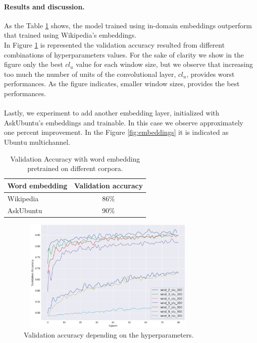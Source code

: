 \documentclass[10pt,twocolumn,letterpaper]{article}
\begin{document}
\paragraph{Results and discussion.}
As the Table \ref{table:accuracy} shows, the model trained using in-domain embeddings outperform that trained using Wikipedia's embeddings. \\
In Figure \ref{fig:wiki} is represented the validation accuracy resulted from different combinations of hyperparameters values. For the sake of clarity we show in the figure only the best $cl_{u}$ value for each window size, but we observe that increasing too much the number of units of the convolutional layer, $cl_{u}$, provides worst performances.  As the figure indicates, smaller window sizes, provides the best performances. \\~\\
Lastly, we experiment to add another embedding layer, initialized with AskUbuntu's embeddings and trainable. In this case we observe approximately one percent improvement. In the Figure \ref{fig:embeddings} it is indicated as Ubuntu multichannel.
\begin{table}
\begin{center}
\begin{tabular}{|l|c|}
\hline
Word embedding & Validation accuracy \\
\hline
Wikipedia & 86\% \\
AskUbuntu & 90\% \\
\hline
\end{tabular}
\end{center}
\caption{Validation Accuracy with word embedding pretrained on different corpora.}
\label{table:accuracy}
\end{table}
\begin{figure}[t]
\begin{center}
\includegraphics[width=90mm, height= 55mm, scale=1]{img/wiki.png}
\end{center}
\caption{Validation accuracy depending on the hyperparameters.}
\label{fig:wiki}
\end{figure}
\end{document}

